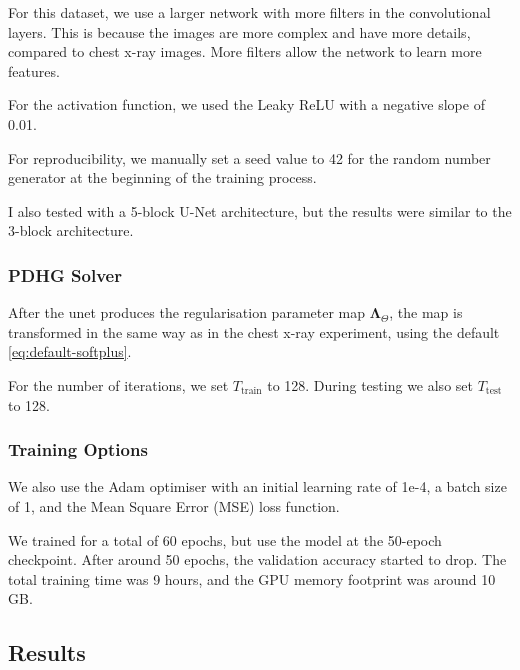 \documentclass[12pt]{article}
\begin{document}
For this dataset, we use a larger network with more filters in the convolutional layers.
This is because the images are more complex and have more details,  compared to chest x-ray images.
More filters allow the network to learn more features.

For the activation function, we used the Leaky ReLU with a negative slope of 0.01.


For reproducibility, we manually set a seed value to 42 for the random number generator at the beginning of the training process.

I also tested with a 5-block U-Net architecture, but the results were similar to the 3-block architecture.


\subsubsection{PDHG Solver}


After the unet produces the regularisation parameter map $\mathbf{\Lambda}_{\Theta}$,
the map is transformed in the same way as in the chest x-ray experiment, using the default \ref{eq:default-softplus}.

For the number of iterations, we set 
$T_{\text{train}}$ to 128.
During testing we also set $T_{\text{test}}$ to 128.


\subsubsection{Training Options}

We also use the Adam optimiser with an initial learning rate of 1e-4, a batch size of 1, and the Mean Square Error (MSE) loss function.

We trained for a total of 60 epochs, but use the model at the 50-epoch checkpoint. 
After around 50 epochs, the validation accuracy started to drop.
The total training time was 9 hours, and the GPU memory footprint was around 10 GB.

\subsection{Results}
\end{document}
